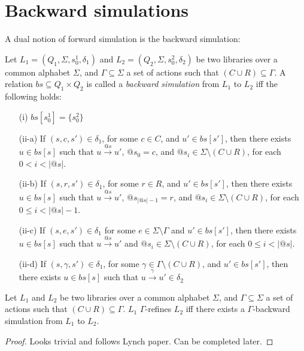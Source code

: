 \section{Backward simulations}\label{app:backSim}

A dual notion of forward simulation is the backward simulation:
\begin{dfn}
Let $L_1=(Q_1,\Sigma, s_0^1, \delta_1)$ and $L_2=(Q_2,\Sigma, s_0^2, \delta_2)$ be two libraries over a common alphabet $\Sigma$, and $\Gamma\subseteq \Sigma$ a set of actions such that $(C\cup R)\subseteq \Gamma$. A relation $bs \subseteq Q_1 \times Q_2$ is called a \emph{backward simulation} from $L_1$ to $L_2$ iff the following holds:
\begin{itemize}
\item[(i)] $bs[s_0^1] = \{s_0^2 \}$
\item[(ii-a)] If $(s,c,s') \in \delta_1$, for some $c\in C$, and $u' \in bs[s']$, then there exists $u \in bs[s]$ such that $u \xrightarrow{@s} u'$, $@s_0=c$, and $@s_i\in \Sigma\setminus(C\cup R)$, for each $0<i<|@s|$.
\item[(ii-b)] If $(s,r,s') \in \delta_1$, for some $r\in R$, and $u' \in bs[s']$, then there exists $u \in bs[s]$ such that $u \xrightarrow{@s} u'$, $@s_{|@s| -1}=r$, and $@s_i\in \Sigma\setminus(C\cup R)$, for each $0\leq i<|@s| -1$.
\item[(ii-c)] If $(s,e,s') \in \delta_1$ for some $e \in \Sigma\setminus \Gamma$ and $u' \in bs[s']$, then there exists $u \in bs[s]$ such that $u \xrightarrow{@s} u'$ and $@s_i\in \Sigma\setminus(C\cup R)$, for each $0\leq i<|@s|$.
\item[(ii-d)] If $(s,\gamma, s') \in \delta_1$, for some $\gamma\in \Gamma\setminus (C\cup R)$, and $u' \in bs[s']$, then there exists $u \in bs[s]$ such that $u\xrightarrow{\gamma} u' \in \delta_2$
\end{itemize}
\end{dfn}

\begin{lem}
Let $L_1$ and $L_2$ be two libraries over a common alphabet $\Sigma$, and $\Gamma\subseteq \Sigma$ a set of actions such that $(C\cup R)\subseteq \Gamma$. $L_1$ $\Gamma$-refines $L_2$ if{f} there exists a $\Gamma$-backward simulation from $L_1$ to $L_2$.
\end{lem}
\begin{proof}
Looks trivial and follows Lynch paper. Can be completed later.
\end{proof}

